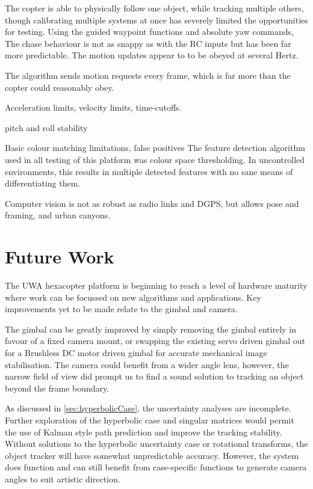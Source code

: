 \documentclass[a4paper, 11pt, titlepage]{article}
\begin{document}
    The copter is able to physically follow one object, while tracking multiple others, though calibrating multiple systems at once has severely limited the opportunities for testing.
    Using the guided waypoint functions and absolute yaw commands, The chase behaviour is not as snappy as with the RC inputs but has been far more predictable.  The motion updates appear to to be obeyed at several Hertz.
    
    The algorithm sends motion requests every frame, which is far more than the copter could reasonably obey.



    Acceleration limits, velocity limits, time-cutoffs.

    pitch and roll stability

    Basic colour matching limitations, false positives
    The feature detection algorithm used in all testing of this platform was colour space thresholding.  In uncontrolled environments, this results in multiple detected features with no sane means of differentiating them.

    Computer vision is not as robust as radio links and DGPS, but allows pose and framing, and urban canyons.

\section{Future Work}

  The UWA hexacopter platform is beginning to reach a level of hardware maturity where work can be focussed on new algorithms and applications.  Key improvements yet to be made relate to the gimbal and camera.

  The gimbal can be greatly improved by simply removing the gimbal entirely in favour of a fixed camera mount, or swapping the existing servo driven gimbal out for a Brushless DC motor driven gimbal for accurate mechanical image stabilisation.  The camera could benefit from a wider angle lens, however, the narrow field of view did prompt us to find a sound solution to tracking an object beyond the frame boundary.

  As discussed in \ref{sec:hyperbolicCase}, the uncertainty analyses are incomplete.  Further exploration of the hyperbolic case and singular matrices would permit the use of Kalman style path prediction and improve the tracking stability.
  Without solutions to the hyperbolic uncertainty case or rotational transforms, the object tracker will have somewhat unpredictable accuracy.  However, the system does function and can still benefit from case-specific functions to generate camera angles to suit artistic direction.
\end{document}
